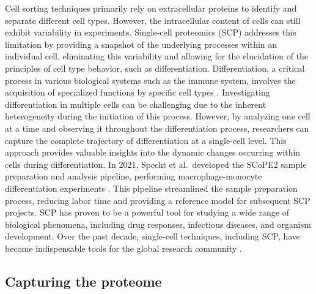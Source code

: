 \documentclass[
  11pt,
]{article}
\begin{document}
Cell sorting techniques primarily rely on extracellular proteins to
identify and separate different cell types. However, the intracellular
content of cells can still exhibit variability in experiments.
Single-cell proteomics (SCP) addresses this limitation by providing a
snapshot of the underlying processes within an individual cell,
eliminating this variability and allowing for the elucidation of the
principles of cell type behavior, such as differentiation.
Differentiation, a critical process in various biological systems such
as the immune system, involves the acquisition of specialized functions
by specific cell types \citep{Fang2018}. Investigating differentiation
in multiple cells can be challenging due to the inherent heterogeneity
during the initiation of this process. However, by analyzing one cell at
a time and observing it throughout the differentiation process,
researchers can capture the complete trajectory of differentiation at a
single-cell level. This approach provides valuable insights into the
dynamic changes occurring within cells during differentiation. In 2021,
Specht et al.~developed the SCoPE2 sample preparation and analysis
pipeline, performing macrophage-monocyte differentiation experiments
\citep{Specht2021}. This pipeline streamlined the sample preparation
process, reducing labor time and providing a reference model for
subsequent SCP projects. SCP has proven to be a powerful tool for
studying a wide range of biological phenomena, including drug responses,
infectious diseases, and organism development. Over the past decade,
single-cell techniques, including SCP, have become indispensable tools
for the global research community \citep{Minakshi2019}.

\hypertarget{capturing-the-proteome}{%
\subsection{Capturing the proteome}\label{capturing-the-proteome}}
\end{document}
